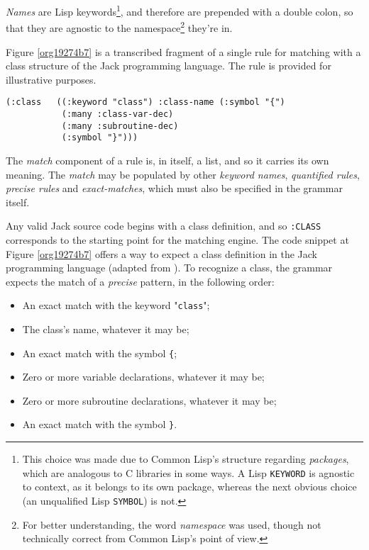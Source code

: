 \documentclass[a4paper,11pt,oneside]{article}
\begin{document}
\emph{Names} are Lisp keywords\footnote{This choice was made due to Common Lisp's structure regarding
\emph{packages}, which are analogous to C libraries in some ways. A Lisp
\texttt{KEYWORD} is agnostic to context, as it belongs to its own package,
whereas the next obvious choice (an unqualified Lisp \texttt{SYMBOL}) is not.}, and therefore are prepended with a
double colon, so that they are agnostic to the namespace\footnote{For better understanding, the word \emph{namespace} was used, though
not technically correct from Common Lisp's point of view.} they're
in.

Figure \ref{org19274b7} is a transcribed fragment of a single rule
for matching with a class structure of the Jack programming
language. The rule is provided for illustrative purposes.

\begin{verbatim}
(:class   ((:keyword "class") :class-name (:symbol "{")
           (:many :class-var-dec)
           (:many :subroutine-dec)
           (:symbol "}")))
\end{verbatim}
\hfill \break

The \emph{match} component of a rule is, in itself, a list, and so it carries
its own meaning. The \emph{match} may be populated by other \emph{keyword names},
\emph{quantified rules}, \emph{precise rules} and \emph{exact-matches}, which must also be
specified in the grammar itself.

Any valid Jack source code begins with a class definition, and so
\texttt{:CLASS} corresponds to the starting point for the matching engine. The
code snippet at Figure \ref{org19274b7} offers a way to expect a class
definition in the Jack programming language (adapted from
\cite{nand2tetris}). To recognize a class, the grammar expects the match
of a \emph{precise} pattern, in the following order:

\begin{itemize}
\item An exact match with the keyword "\texttt{class}";
\item The class's name, whatever it may be;
\item An exact match with the symbol \texttt{\{};
\item Zero or more variable declarations, whatever it may be;
\item Zero or more subroutine declarations, whatever it may be;
\item An exact match with the symbol \texttt{\}}.
\end{itemize}
\end{document}
